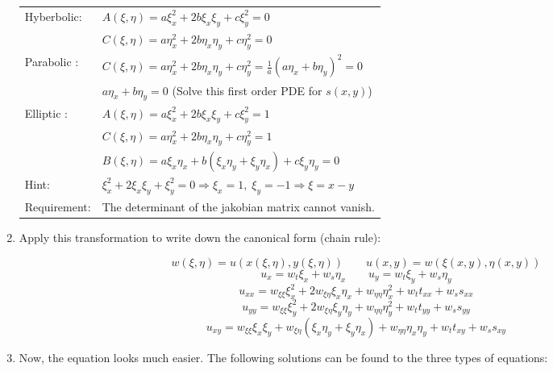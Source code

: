 \documentclass[a4paper]{article}
\begin{document}
\begin{twocolumn}
\begin{enumerate}
\begin{center}
	\begin{tabular}{ll} \toprule
		Hyberbolic: & $A(\xi,\eta) = a \xi_x^2 + 2 b \xi_x \xi_y + c \xi_y^2 = 0$ \\ 
						    & $C(\xi,\eta) = a \eta_x^2 + 2 b \eta_x \eta_y + c \eta_y^2 = 0$ \\ \midrule
		Parabolic : & $C(\xi,\eta) = a \eta_x^2 + 2 b \eta_x \eta_y + c \eta_y^2 = \frac{1}{a} (a \eta_x + b \eta_y)^2 = 0$ \\
		 	          & $a \eta_x + b \eta_y = 0$ (Solve this first order PDE for $s(x,y)$) \\ \midrule
		Elliptic  : & $A(\xi,\eta) = a \xi_x^2 + 2 b \xi_x \xi_y + c \xi_y^2 = 1$ \\
							  & $C(\xi,\eta) = a \eta_x^2 + 2 b \eta_x \eta_y + c \eta_y^2 = 1$ \\
							  & $B(\xi,\eta) = a \xi_x \eta_x + b (\xi_x \eta_y + \xi_y \eta_x) + c \xi_y \eta_y = 0$\\ \bottomrule
		Hint:				& $\xi_x^2 + 2 \xi_x \xi_y + \xi_y^2 =0 \Rightarrow \xi_x = 1, \; \xi_y = -1 \Rightarrow \xi = x - y $ \\
		Requirement:& The determinant of the jakobian matrix cannot vanish.
 	\end{tabular}
\end{center}

\item Apply this transformation to write down the canonical form (chain rule):

$$w(\xi,\eta) = u\left(x(\xi,\eta),y(\xi,\eta)\right) \qquad u(x,y) = w\left(\xi(x,y),\eta(x,y)\right)$$
$$u_x = w_t \xi_x + w_s \eta_x \qquad u_y = w_t \xi_y + w_s \eta_y$$
$$u_{xx} = w_{\xi\xi} \xi_x^2 + 2 w_{\xi\eta} \xi_x \eta_x + w_{\eta\eta} \eta_x^2 + w_t t_{xx} + w_s s_{xx} $$
$$u_{yy} = w_{\xi\xi} \xi_y^2 + 2 w_{\xi\eta} \xi_y \eta_y + w_{\eta\eta} \eta_y^2 + w_t t_{yy} + w_s s_{yy} $$
$$u_{xy} = w_{\xi\xi} \xi_x \xi_y + w_{\xi\eta} (\xi_x \eta_y + \xi_y \eta_x) + w_{\eta\eta} \eta_x \eta_y + w_t t_{xy} + w_s s_{xy}$$

\item Now, the equation looks much easier. The following solutions can be found to the three types of equations:


\end{enumerate}
\end{twocolumn}
\end{document}
